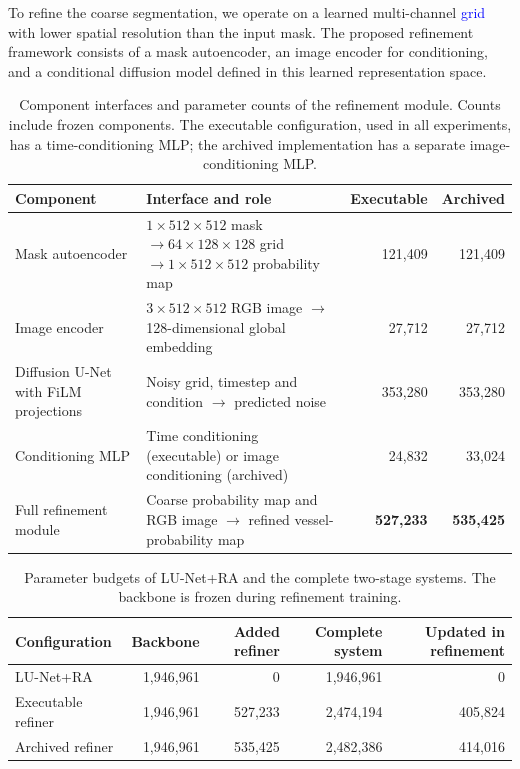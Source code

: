 \documentclass[jimaging,article,submit,pdftex,moreauthors]
  {Definitions/mdpi}
\DeclareRobustCommand{\rev}[1]{\textcolor{blue}{#1}}
\newcommand{\revbegin}{\begingroup\color{blue}}
\DeclareRobustCommand{\rev}[1]{#1}
\newcommand{\revbegin}{\begingroup}
\newcommand{\revend}{\ifhmode\par\fi\endgroup}
\begin{document}
To refine the coarse segmentation, we operate on a learned multi-channel \rev{grid} with lower spatial resolution than the input mask. The proposed refinement framework consists of a mask autoencoder, an image encoder for conditioning, and a conditional diffusion model defined in this learned representation space.
\begin{table}[htbp]\revbegin{}
\centering
\caption{Component interfaces and parameter counts of the refinement module. Counts include frozen components. The executable configuration, used in all experiments, has a time-conditioning MLP; the archived implementation has a separate image-conditioning MLP.}
\label{tab:architecture_params}
\small
\begin{tabularx}{\textwidth}{@{}p{}Xrr@{}}
\toprule
Component & Interface and role & Executable & Archived \\
\midrule
Mask autoencoder & $1\times512\times512$ mask $\rightarrow 64\times128\times128$ grid $\rightarrow 1\times512\times512$ probability map & 121,409 & 121,409 \\
Image encoder & $3\times512\times512$ RGB image $\rightarrow$ 128-dimensional global embedding & 27,712 & 27,712 \\
Diffusion U-Net with FiLM projections & Noisy grid, timestep and condition $\rightarrow$ predicted noise & 353,280 & 353,280 \\
Conditioning MLP & Time conditioning (executable) or image conditioning (archived) & 24,832 & 33,024 \\
\midrule
Full refinement module & Coarse probability map and RGB image $\rightarrow$ refined vessel-probability map & \textbf{527,233} & \textbf{535,425} \\
\bottomrule
\end{tabularx}
\revend{}\end{table}
\begin{table}[htbp]\revbegin{}
\centering
\caption{Parameter budgets of LU-Net+RA and the complete two-stage systems. The backbone is frozen during refinement training.}
\label{tab:complete_parameter_counts}
\small
\begin{tabular}{lrrrr}
\toprule
Configuration & Backbone & Added refiner & Complete system & Updated in refinement \\
\midrule
LU-Net+RA & 1,946,961 & 0 & 1,946,961 & 0 \\
Executable refiner & 1,946,961 & 527,233 & 2,474,194 & 405,824 \\
Archived refiner & 1,946,961 & 535,425 & 2,482,386 & 414,016 \\
\bottomrule
\end{tabular}
\revend{}\end{table}
\end{document}
